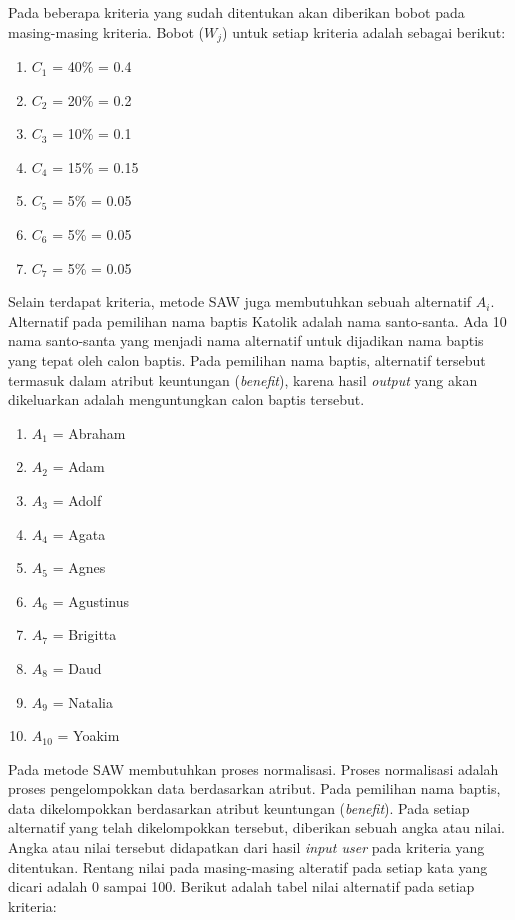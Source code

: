 		Pada beberapa kriteria yang sudah ditentukan akan diberikan bobot pada masing-masing kriteria. Bobot ($W_{j}$) untuk setiap kriteria adalah sebagai berikut:
		
\begin{enumerate}
	\item $C_{1}$ = 40\% = 0.4
	\item $C_{2}$ = 20\% = 0.2
	\item $C_{3}$ = 10\% = 0.1
	\item $C_{4}$ = 15\% = 0.15
	\item $C_{5}$ = 5\% = 0.05
	\item $C_{6}$ = 5\% = 0.05
	\item $C_{7}$ = 5\% = 0.05
\end{enumerate}

Selain terdapat kriteria, metode SAW juga membutuhkan sebuah alternatif $A_{i}$. Alternatif pada pemilihan nama baptis Katolik adalah nama santo-santa. Ada 10 nama santo-santa yang menjadi nama alternatif untuk dijadikan nama baptis yang tepat oleh calon baptis. Pada pemilihan nama baptis, alternatif tersebut termasuk dalam atribut keuntungan (\textit{benefit}), karena hasil \textit{output} yang akan dikeluarkan adalah menguntungkan calon baptis tersebut.

\begin{enumerate}
	\item $A_{1}$ = Abraham
	\item $A_{2}$ = Adam
	\item $A_{3}$ = Adolf
	\item $A_{4}$ = Agata
	\item $A_{5}$ = Agnes
	\item $A_{6}$ = Agustinus
	\item $A_{7}$ = Brigitta
	\item $A_{8}$ = Daud
	\item $A_{9}$ = Natalia
	\item $A_{10}$ = Yoakim
\end{enumerate}

Pada metode SAW membutuhkan proses normalisasi. Proses normalisasi adalah proses pengelompokkan data berdasarkan atribut. Pada pemilihan nama baptis, data dikelompokkan berdasarkan atribut keuntungan (\textit{benefit}). Pada setiap alternatif yang telah dikelompokkan tersebut, diberikan sebuah angka atau nilai. Angka atau nilai tersebut didapatkan dari hasil \textit{input user} pada kriteria yang ditentukan. Rentang nilai pada masing-masing alteratif pada setiap kata yang dicari adalah 0 sampai 100. Berikut adalah tabel nilai alternatif pada setiap kriteria:

